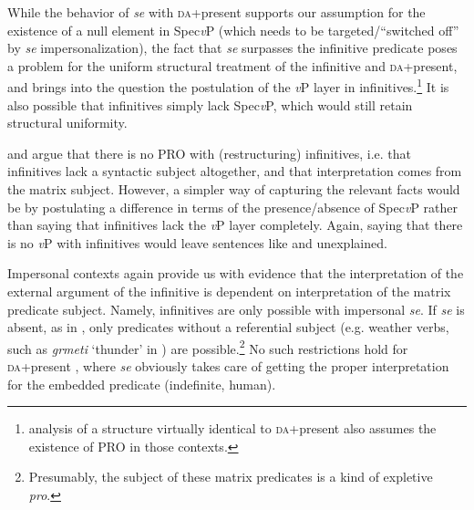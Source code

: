 \documentclass[output=paper,
modfonts,
newtxmath,
hidelinks,
]{langscibook}
\begin{document}
\ea \label{ex14}
	\z
\z

\noindent While the behavior of \textit{se} with \textsc{da}+present supports our assumption for the existence of a null element in Spec\textit{v}P (which needs to be targeted/``switched off'' by \textit{se} impersonalization), the fact that \textit{se} surpasses the infinitive predicate poses a problem for the uniform structural treatment of the infinitive and \textsc{da}+present, and brings into the question the postulation of the \textit{v}P layer in infinitives.\footnote{\label{fn5} analysis of a structure virtually identical to \textsc{da}+present also assumes the existence of PRO in those contexts.} It is also possible that infinitives simply lack Spec\textit{v}P, which would still retain structural uniformity.\largerpage[2]

\citet{Wurmbrand2003} and \citet{TodorovicWurmbrand2015} argue that there is no PRO with (restructuring) infinitives, i.e. that infinitives lack a syntactic subject altogether, and that interpretation comes from the matrix subject. However, a simpler way of capturing the relevant facts would be by postulating a difference in terms of the presence/absence of Spec\textit{v}P rather than saying that infinitives lack the \textit{v}P layer completely. Again, saying that there is no \textit{v}P with infinitives would leave sentences like  and  unexplained.

Impersonal contexts again provide us with evidence that the interpretation of the external argument of the infinitive is dependent on interpretation of the matrix predicate subject. Namely, infinitives are only possible with impersonal \textit{se}. If \textit{se} is absent, as in , only predicates without a referential subject (e.g. weather verbs, such as \textit{grmeti} ‘thunder’ in ) are possible.\footnote{\label{fn6}Presumably, the subject of these matrix predicates is a kind of expletive \textit{pro}.} No such restrictions hold for \textsc{da}+present , where \textit{se} obviously takes care of getting the proper interpretation for the embedded predicate (indefinite, human).
\end{document}
